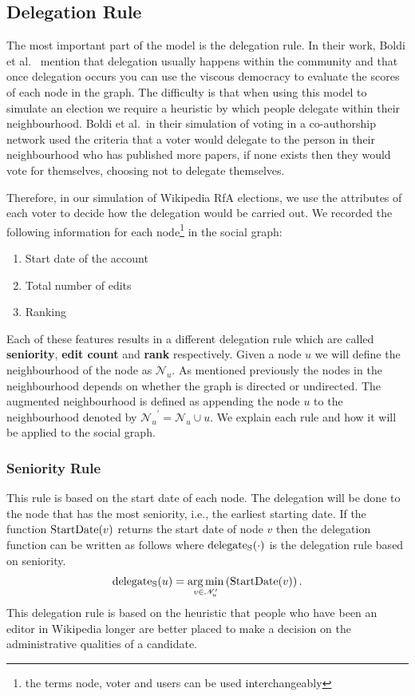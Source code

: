 \subsection{Delegation Rule}
The most important part of the model is the delegation rule. In their work, Boldi et al.\ \cite{ViscousDemocracy} mention that delegation usually happens within the community and that once delegation occurs you can use the viscous democracy to evaluate the scores of each node in the graph. The difficulty is that when using this model to simulate an election we require a heuristic by which people delegate within their neighbourhood. Boldi et al.\ in their simulation of voting in a co-authorship network used the criteria that a voter would delegate to the person in their neighbourhood who has published more papers, if none exists then they would vote for themselves, choosing not to delegate themselves.

Therefore, in our simulation of Wikipedia RfA elections, we use the attributes of each voter to decide how the delegation would be carried out. We recorded the following information for each node\footnote{the terms node, voter and users can be used interchangeably} in the social graph:
\begin{enumerate}
    \item Start date of the account
    \item Total number of edits
    \item Ranking
\end{enumerate}
Each of these features results in a different delegation rule which are called \textbf{seniority}, \textbf{edit count} and \textbf{rank} respectively. Given a node $u$ we will define the neighbourhood of the node as $\mathcal{N}_u$. As mentioned previously the nodes in the neighbourhood depends on whether the graph is directed or undirected. The augmented neighbourhood is defined as appending the node $u$ to the neighbourhood denoted by ${\mathcal{N}_u}^\prime = \mathcal{N}_u \cup u$. We explain each rule and how it will be applied to the social graph.

\subsubsection{Seniority Rule}
This rule is based on the start date of each node. The delegation will be done to the node that has the most seniority, i.e., the earliest starting date. If the function $\operatorname*{StartDate}(v)$ returns the start date of node $v$ then the delegation function can be written as follows where $\operatorname*{delegate_S}(\cdot)$ is the delegation rule based on seniority.
\[\operatorname*{delegate_S}(u)  = \operatorname*{arg\,min}_{v \in \mathcal{N}_u^\prime} \left( \operatorname*{StartDate}(v) \right).\]
This delegation rule is based on the heuristic that people who have been an editor in Wikipedia longer are better placed to make a decision on the administrative qualities of a candidate. 


